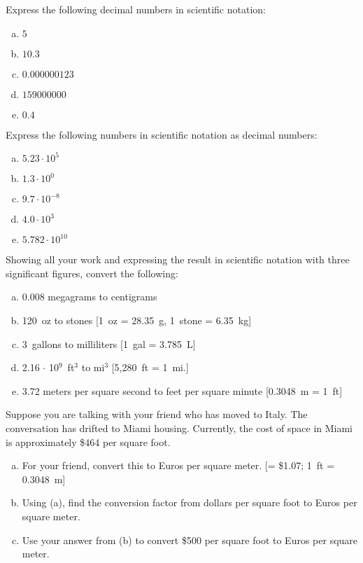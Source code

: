 \documentclass[11pt,letterpaper]{article}
\begin{document}

 Express the following decimal numbers in scientific notation:
	\begin{enumerate}[(a)]
	\item $5$
	\item $10.3$
	\item $0.000000123$
	\item $159000000$
	\item $0.4$
	\end{enumerate}



\newpage



 Express the following numbers in scientific notation as decimal numbers:
	\begin{enumerate}[(a)]
	\item $5.23 \cdot 10^5$
	\item $1.3 \cdot 10^0$
	\item $9.7 \cdot 10^{-8}$
	\item $4.0 \cdot 10^3$
	\item $5.782 \cdot 10^{10}$
	\end{enumerate}



\newpage



 Showing all your work and expressing the result in scientific notation with three significant figures, convert the following:
	\begin{enumerate}[(a)]
	\item 0.008 megagrams to centigrams
	\item 120~oz to stones [1~oz = 28.35~g, 1~stone = 6.35~kg]
	\item 3~gallons to milliliters [1~gal = 3.785~L]
	\item 2.16 $\cdot$ 10$^9$~ft$^3$ to mi$^3$ [5,280~ft = 1~mi.]
	\item 3.72 meters per square second to feet per square minute [0.3048~m = 1~ft]
	\end{enumerate}



\newpage



 Suppose you are talking with your friend who has moved to Italy. The conversation has drifted to Miami housing. Currently, the cost of space in Miami is approximately \$464 per square foot. 
	\begin{enumerate}[(a)]
	\item For your friend, convert this to Euros per square meter. [= \$1.07; 1~ft = 0.3048~m]
	\item Using (a), find the conversion factor from dollars per square foot to Euros per square meter. 
	\item Use your answer from (b) to convert \$500 per square foot to Euros per square meter. 
	\end{enumerate}
\end{document}

